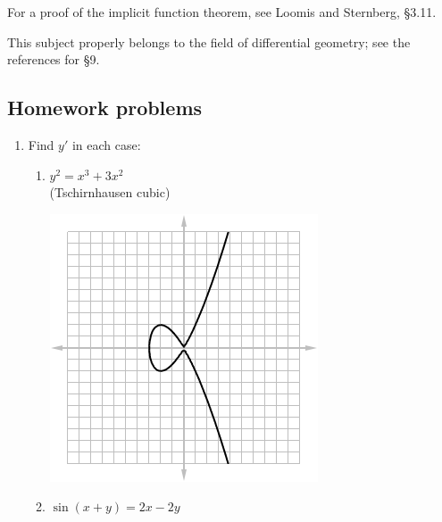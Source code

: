 For a proof of the implicit function theorem, see Loomis and Sternberg, \S3.11.

This subject properly belongs to the field of differential geometry; see the references for \S9.

\subsection{Homework problems}
\begin{enumerate}
  \item Find $ y' $ in each case:
    \begin{multicols}{3}
    \begin{enumerate}
      \item $ y^2 = x^3 + 3x^2 $\\(Tschirnhausen cubic)
            \begin{center}
              \includegraphics[width=\linewidth]{implicit10}
            \end{center}
      \item $ \sin(x + y) = 2x - 2y $
            \begin{center}

\end{center}
\end{enumerate}
\end{multicols}
\end{enumerate}
